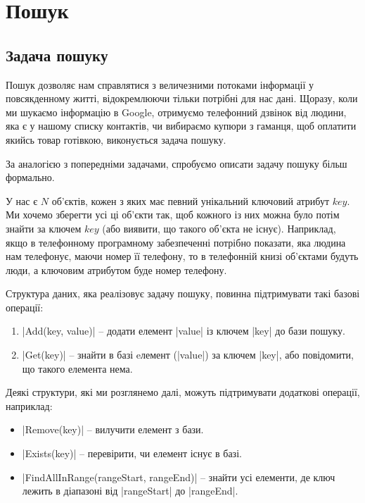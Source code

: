 \documentclass[12pt,a4paper]{report}
\begin{document}
\chapter{Пошук}

\begingroup
\let\clearpage\relax
\tableofcontents
\endgroup



\section{Задача пошуку}

Пошук дозволяє нам справлятися з величезними потоками інформації у повсякденному житті, відокремлюючи тільки потрібні для нас дані. Щоразу, коли ми шукаємо інформацію в Google, отримуємо телефонний дзвінок від людини, яка є у нашому списку контактів, чи вибираємо купюри з гаманця, щоб оплатити якийсь товар готівкою, виконується задача пошуку.

За аналогією з попередніми задачами, спробуємо описати задачу пошуку більш формально.

У нас є \(N\) об’єктів, кожен з яких має певний унікальний ключовий атрибут \(key\). Ми хочемо зберегти усі ці об’єкти так, щоб кожного із них можна було потім знайти за ключем \(key\) (або виявити, що такого об’єкта не існує). Наприклад, якщо в телефонному програмному забезпеченні потрібно показати, яка людина нам телефонує, маючи номер її телефону, то в телефонній книзі об’єктами будуть люди, а ключовим атрибутом буде номер телефону.

Структура даних, яка реалізовує задачу пошуку, повинна підтримувати такі базові операції:

\begin{enumerate}
    \item |Add(key, value)| -- додати елемент |value| із ключем |key| до бази пошуку.
    \item |Get(key)| -- знайти в базі eлемент (|value|) за ключем |key|, або повідомити, що такого елемента нема.
\end{enumerate}

Деякі структури, які ми розглянемо далі, можуть підтримувати додаткові операції, наприклад:
\begin{itemize}
    \item |Remove(key)| -- вилучити елемент з бази.
    \item |Exists(key)| -- перевірити, чи елемент існує в базі.
    \item |FindAllInRange(rangeStart, rangeEnd)| -- знайти усі елементи, де ключ лежить в діапазоні від |rangeStart| до |rangeEnd|.
\end{itemize}
\end{document}
